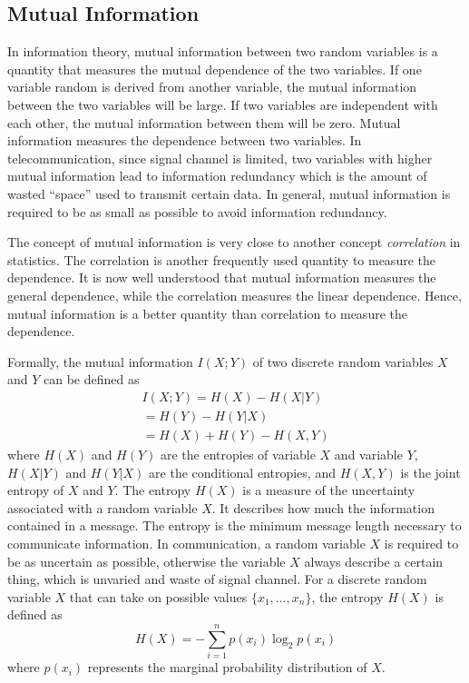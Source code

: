\subsection{Mutual Information}
In information theory, mutual information between two random variables is a quantity that measures the mutual dependence of the two variables. If one variable random is derived from another variable, the mutual information between the two variables will be large. If two variables are independent with each other, the mutual information between them will be zero. Mutual information measures the dependence between two variables. In telecommunication, since signal channel is limited, two variables with higher mutual information lead to information redundancy which is the amount of wasted ``space'' used to transmit certain data. In general, mutual information is required to be as small as possible to avoid information redundancy. 

The concept of mutual information is very close to another concept \textit{correlation} in statistics. The correlation is another frequently used quantity to measure the dependence. It is now well understood \cite{Li1990} that mutual information measures the general dependence, while the correlation measures the linear dependence. Hence, mutual information is a better quantity than correlation to measure the dependence.

Formally, the mutual information $I(X;Y)$ of two discrete random variables $X$ and $Y$ can be defined as
\begin{eqnarray}
 I(X;Y) = H(X) - H(X|Y) \nonumber \\
= H(Y) - H(Y|X) \nonumber \\ 
 = H(X) + H(Y) - H(X,Y) 
\end{eqnarray}
where $H(X)$ and $H(Y)$ are the entropies of variable $X$ and variable $Y$, $H(X|Y)$ and $H(Y|X)$ are the conditional entropies, and $H(X,Y)$ is the joint entropy of $X$ and $Y$. The entropy $H(X)$ is a measure of the uncertainty associated with a random variable $X$. It describes how much the information contained in a message. The entropy is the minimum message length necessary to communicate information. In communication, a random variable $X$ is required to be as uncertain as possible, otherwise the variable $X$ always describe a certain thing, which is unvaried and waste of signal channel. For a discrete random variable $X$ that can take on possible values $\{x_{1},\ldots,x_{n}\}$, the entropy $H(X)$ is defined as 
\begin{equation}
   H(X) =  - {\sum_{i=1}^np(x_i)\log_2 p(x_i)} 
\end{equation}
where $p(x_i)$ represents the marginal probability distribution of $X$.

